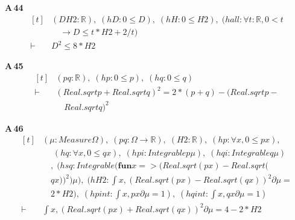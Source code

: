 \noindent\textbf{A\,44}\quad{}
{\footnotesize\[ \begin{aligned}[t]
&(\mathit{D} \mathit{H2} : \mathbb{R} ),\; (\mathit{hD} : 0 \leq \mathit{D}),\; (\mathit{hH} : 0 \leq \mathit{H2}),\; (\mathit{hall} : \forall \mathit{t} : \mathbb{R} , 0 < \mathit{t}\\
&\quad \to \mathit{D} \leq \mathit{t} * \mathit{H2} + 2 / \mathit{t})\\
\vdash\;&\mathit{D} ^{2} \leq 8 * \mathit{H2}
\end{aligned} \]}

\noindent\textbf{A\,45}\quad{}
{\footnotesize\[ \begin{aligned}[t]
&(\mathit{p} \mathit{q} : \mathbb{R} ),\; (\mathit{hp} : 0 \leq \mathit{p}),\; (\mathit{hq} : 0 \leq \mathit{q})\\
\vdash\;&(\mathit{Real}.\mathit{sqrt} \mathit{p} + \mathit{Real}.\mathit{sqrt} \mathit{q}) ^{2} = 2 * (\mathit{p} + \mathit{q}) - (\mathit{Real}.\mathit{sqrt} \mathit{p} -\\
&\quad \mathit{Real}.\mathit{sqrt} \mathit{q}) ^{2}
\end{aligned} \]}

\noindent\textbf{A\,46}\quad{}
{\footnotesize\[ \begin{aligned}[t]
&(\mu : \mathit{Measure} \Omega ),\; (\mathit{p} \mathit{q} : \Omega \to \mathbb{R} ),\; (\mathit{H2} : \mathbb{R} ),\; (\mathit{hp} : \forall \mathit{x}, 0 \leq \mathit{p} \mathit{x}),\\
&\quad \; (\mathit{hq} : \forall \mathit{x}, 0 \leq \mathit{q} \mathit{x}),\; (\mathit{hpi} : \mathit{Integrable} \mathit{p} \mu ),\; (\mathit{hqi} : \mathit{Integrable} \mathit{q} \mu )\\
&\quad ,\; (\mathit{hsq} : \mathit{Integrable} (\mathbf{fun} \mathit{x} => (\mathit{Real}.\mathit{sqrt} (\mathit{p} \mathit{x}) - \mathit{Real}.\mathit{sqrt} (\\
&\quad \mathit{q} \mathit{x})) ^{2}) \mu ),\; (\mathit{hH2} : \int \mathit{x}, (\mathit{Real}.\mathit{sqrt} (\mathit{p} \mathit{x}) - \mathit{Real}.\mathit{sqrt} (\mathit{q} \mathit{x})) ^{2} ∂\mu =\\
&\quad 2 * \mathit{H2}),\; (\mathit{hpint} : \int \mathit{x}, \mathit{p} \mathit{x} ∂\mu = 1),\; (\mathit{hqint} : \int \mathit{x}, \mathit{q} \mathit{x} ∂\mu = 1)\\
\vdash\;&\int \mathit{x}, (\mathit{Real}.\mathit{sqrt} (\mathit{p} \mathit{x}) + \mathit{Real}.\mathit{sqrt} (\mathit{q} \mathit{x})) ^{2} ∂\mu = 4 - 2 * \mathit{H2}
\end{aligned} \]}

